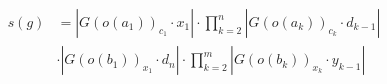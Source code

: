 \documentclass[preview]{standalone}
\begin{document}
\begin{align*}
s(g) &= \left\lvert G(o(a_1))_{c_1} \cdot x_1\right\rvert \cdot \prod_{k=2}^{n}\left\lvert G(o(a_{k}))_{c_{k}} \cdot d_{k-1}\right\rvert \\ &\cdot \left\lvert G(o(b_1))_{x_1} \cdot d_{n}\right\rvert \cdot \prod_{k=2}^{m}\left\lvert G(o(b_{k}))_{x_{k}} \cdot y_{k-1}\right\rvert
\end{align*}
\end{document}
